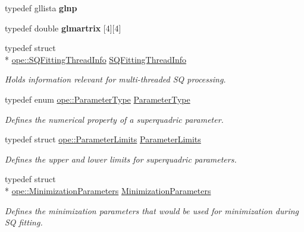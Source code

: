 \begin{DoxyCompactItemize}
\item 
\hypertarget{namespaceope_a77010c553b8b64bf199e9bf40410e5e9}{typedef gllista {\bfseries glnp}}\label{namespaceope_a77010c553b8b64bf199e9bf40410e5e9}

\item 
\hypertarget{namespaceope_a05344384834d0e0c36490998db356af7}{typedef double {\bfseries glmartrix} \mbox{[}4\mbox{]}\mbox{[}4\mbox{]}}\label{namespaceope_a05344384834d0e0c36490998db356af7}

\item 
\hypertarget{namespaceope_a716ace4d47672efc4086c9bade4ae355}{typedef struct \\*
\hyperlink{structope_1_1_s_q_fitting_thread_info}{ope\-::\-S\-Q\-Fitting\-Thread\-Info} \hyperlink{namespaceope_a716ace4d47672efc4086c9bade4ae355}{S\-Q\-Fitting\-Thread\-Info}}\label{namespaceope_a716ace4d47672efc4086c9bade4ae355}

\begin{DoxyCompactList}\small\item\em Holds information relevant for multi-\/threaded S\-Q processing. \end{DoxyCompactList}\item 
\hypertarget{namespaceope_a14e18db1b834d879f8aa13323c1baba0}{typedef enum \hyperlink{namespaceope_a369d89d74d4649418822f9acefc317c6}{ope\-::\-Parameter\-Type} \hyperlink{namespaceope_a14e18db1b834d879f8aa13323c1baba0}{Parameter\-Type}}\label{namespaceope_a14e18db1b834d879f8aa13323c1baba0}

\begin{DoxyCompactList}\small\item\em Defines the numerical property of a superquadric parameter. \end{DoxyCompactList}\item 
\hypertarget{namespaceope_afc56254b7c9997afcb304630a5a735c5}{typedef struct \hyperlink{structope_1_1_parameter_limits}{ope\-::\-Parameter\-Limits} \hyperlink{namespaceope_afc56254b7c9997afcb304630a5a735c5}{Parameter\-Limits}}\label{namespaceope_afc56254b7c9997afcb304630a5a735c5}

\begin{DoxyCompactList}\small\item\em Defines the upper and lower limits for superquadric parameters. \end{DoxyCompactList}\item 
\hypertarget{namespaceope_a2eb8ddd96a375848ff9ec424f433bd3b}{typedef struct \\*
\hyperlink{structope_1_1_minimization_parameters}{ope\-::\-Minimization\-Parameters} \hyperlink{namespaceope_a2eb8ddd96a375848ff9ec424f433bd3b}{Minimization\-Parameters}}\label{namespaceope_a2eb8ddd96a375848ff9ec424f433bd3b}

\begin{DoxyCompactList}\small\item\em Defines the minimization parameters that would be used for minimization during S\-Q fitting. \end{DoxyCompactList}\end{DoxyCompactItemize}
